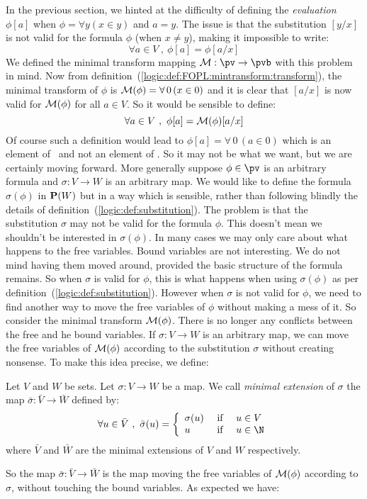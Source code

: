 In the previous section, we hinted at the difficulty of defining the
{\em evaluation} $\phi[a]$ when $\phi=\forall y(x\in y)$ and $a=y$.
The issue is that the substitution $[y/x]$ is not valid for the
formula $\phi$ (when $x\neq y$), making it impossible to write:
    \[
    \forall a\in V\ ,\ \phi[a]=\phi[a/x]
    \]
We defined the minimal transform mapping ${\cal M}:\pv\to\pvb$ with
this problem in mind. Now from
definition~(\ref{logic:def:FOPL:mintransform:transform}), the
minimal transform of $\phi$ is ${\cal M}(\phi)=\forall\,0\,(x\in 0)$
and it is clear that $[a/x]$ is now valid for ${\cal M}(\phi)$ for
all $a\in V$. So it would be sensible to define:
    \[
    \forall a\in V\ ,\ \phi[a]={\cal M}(\phi)[a/x]
    \]
Of course such a definition would lead to $\phi[a]=\forall\,0\,(a\in
0)$ which is an element of \pvb\ and not an element of \pv. So it
may not be what we want, but we are certainly moving forward. More
generally suppose $\phi\in\pv$ is an arbitrary formula and
$\sigma:V\to W$ is an arbitrary map. We would like to define the
formula $\sigma(\phi)$ in ${\bf P}(W)$ but in a way which is
sensible, rather than following blindly the details of
definition~(\ref{logic:def:substitution}). The problem is that the
substitution $\sigma$ may not be valid for the formula $\phi$. This
doesn't mean we shouldn't be interested in $\sigma(\phi)$. In many
cases we may only care about what happens to the free variables.
Bound variables are not interesting. We do not mind having them
moved around, provided the basic structure of the formula remains.
So when $\sigma$ is valid for $\phi$, this is what happens when
using $\sigma(\phi)$ as per
definition~(\ref{logic:def:substitution}). However when $\sigma$ is
not valid for $\phi$, we need to find another way to move the free
variables of $\phi$ without making a mess of it. So consider the
minimal transform ${\cal M}(\phi)$. There is no longer any conflicts
between the free and he bound variables. If $\sigma:V\to W$ is an
arbitrary map, we can move the free variables of ${\cal M}(\phi)$
according to the substitution $\sigma$  without creating nonsense.
To make this idea precise, we define: 
\begin{defin}\label{logic:def:FOPL:commute:minextensioon:map}
Let $V$ and $W$ be sets. Let $\sigma:V\to W$ be a map. We call {\em
minimal extension} of $\sigma$ the map
$\bar{\sigma}:\bar{V}\to\bar{W}$ defined by:
    \[
    \forall u\in \bar{V}\ ,\ \bar{\sigma}(u)=\left\{
    \begin{array}{lcl}
    \sigma(u)&\mbox{\ if\ }&u\in V\\
    u&\mbox{\ if\ }&u\in\N
    \end{array}
    \right.
    \]
where $\bar{V}$ and $\bar{W}$ are the minimal extensions of $V$ and
$W$ respectively.
\end{defin}
So the map $\bar{\sigma}:\bar{V}\to\bar{W}$ is the map moving the
free variables of ${\cal M}(\phi)$ according to $\sigma$, without
touching the bound variables. As expected we have:

